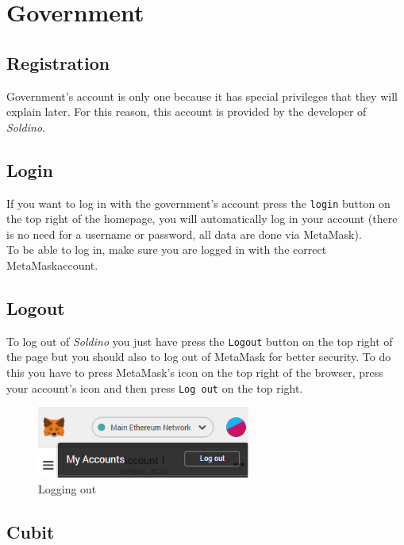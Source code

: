 \section{Government}
	\subsection{Registration}
	Government's account is only one because it has special privileges that
	they will explain later. For this reason, this account is provided 
	by the developer of \textit{Soldino}.
	\subsection{Login}
	If you want to log in with the government's account press the \texttt{login}
	 button on the 
	top right of the homepage, you will automatically log in your account 
	(there is no need for a username or password, all data are done via MetaMask). 
	\\To be able to log in, make sure you are logged in with the correct 
	MetaMask\glosp account.
	\subsection{Logout}

	To log out of \textit{Soldino} you just have press the \texttt{Logout} button on 
	the top right of the page but you should also to log out of MetaMask\glosp{} 
	for better security. To do this you have to press MetaMask's icon on the top 
	right of the browser, press your account's icon and then press \texttt{Log out}
	on the top right.
	\begin{figure}[H]
		\includegraphics[width=7cm]{res/images/logout_metamask.png}
		\centering
		\caption{Logging out}
	\end{figure}
\pagebreak
	\subsection{Cubit}

